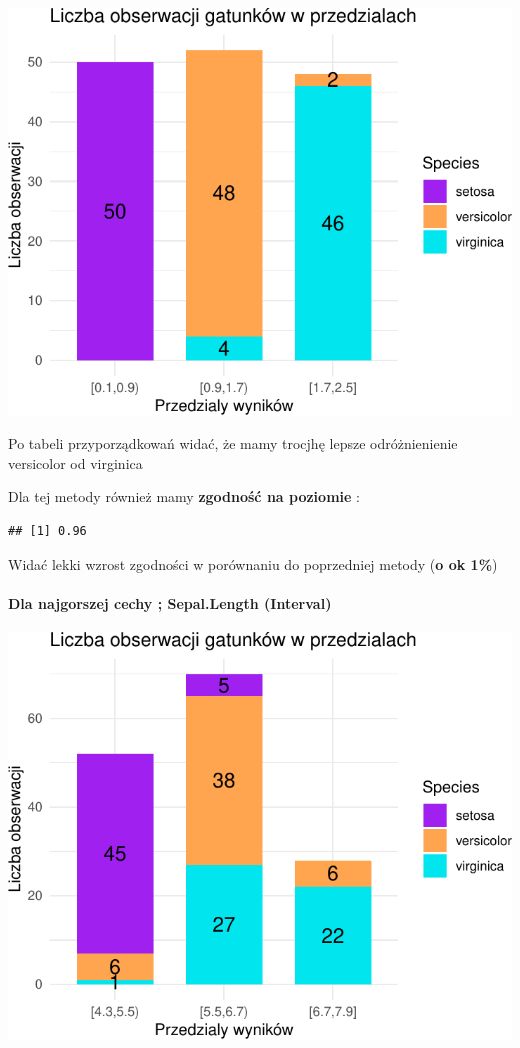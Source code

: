 \documentclass[
  12pt,
]{article}
\begin{document}
\begin{center}\includegraphics{Sprawozdanie2_files/figure-latex/tabela_kondygnacji_2_najl-1} \end{center}

Po tabeli przyporządkowań widać, że mamy trocjhę lepsze odróżnienienie
versicolor od virginica

Dla tej metody również mamy \textbf{zgodność na poziomie} :

\begin{verbatim}
## [1] 0.96
\end{verbatim}

Widać lekki wzrost zgodności w porównaniu do poprzedniej metody
(\textbf{o ok 1\%})

\paragraph{Dla najgorszej cechy ; Sepal.Length
(Interval)}\label{dla-najgorszej-cechy-sepal.length-interval}

\begin{center}\includegraphics{Sprawozdanie2_files/figure-latex/tabela_kondygnacji_2_najg-1} \end{center}
\end{document}
